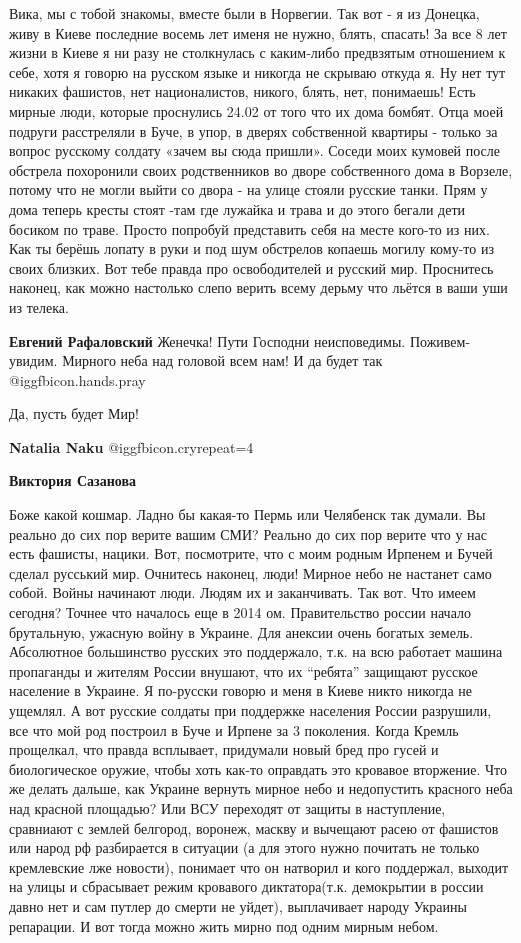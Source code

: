 \begin{itemize}
\begin{itemize}
Вика, мы с тобой знакомы, вместе были в Норвегии. Так вот - я из Донецка, живу
в Киеве последние восемь лет именя не нужно, блять, спасать! За все 8 лет жизни
в Киеве я ни разу не столкнулась с каким-либо предвзятым отношением к себе,
хотя я говорю на русском языке и никогда не скрываю откуда я. Ну нет тут
никаких фашистов, нет националистов, никого, блять, нет, понимаешь! Есть мирные
люди, которые проснулись 24.02 от того что их дома бомбят. Отца моей подруги
расстреляли в Буче, в упор, в дверях собственной квартиры - только за вопрос
русскому солдату «зачем вы сюда пришли». Соседи моих кумовей после обстрела
похоронили своих родственников во дворе собственного дома в Ворзеле, потому что
не могли выйти со двора - на улице стояли русские танки. Прям у дома теперь
кресты стоят -там где лужайка и трава и до этого бегали дети босиком по траве.
Просто попробуй представить себя на месте кого-то из них. Как ты берёшь лопату
в руки и под шум обстрелов копаешь могилу кому-то из своих близких. Вот тебе
правда про освободителей и русский мир. Проснитесь наконец, как можно настолько
слепо верить всему дерьму что льётся в ваши уши из телека.

\textbf{Евгений Рафаловский} Женечка! Пути Господни неисповедимы. Поживем-увидим. Мирного неба над головой всем нам! И да будет так  @igg{fbicon.hands.pray}

Да, пусть будет Мир!

\textbf{Natalia Naku}  @igg{fbicon.cry}{repeat=4} 

\textbf{Виктория Сазанова} 

Боже какой кошмар. Ладно бы какая-то Пермь или Челябенск так думали. Вы реально
до сих пор верите вашим СМИ? Реально до сих пор верите что у нас есть фашисты,
нацики. Вот, посмотрите, что с моим родным Ирпенем и Бучей сделал русський мир.
Очнитесь наконец, люди! Мирное небо не настанет само собой. Войны начинают
люди. Людям их и заканчивать. Так вот. Что имеем сегодня? Точнее что началось
еще в 2014 ом. Правительство россии начало брутальную, ужасную войну в Украине.
Для анексии очень богатых земель. Абсолютное большинство русских это
поддержало, т.к. на всю работает машина пропаганды и жителям России внушают,
что их \enquote{ребята} защищают русское население в Украине. Я по-русски говорю и меня
в Киеве никто никогда не ущемлял. А вот русские солдаты при поддержке населения
России разрушили, все что мой род построил в Буче и Ирпене за 3 поколения.
Когда Кремль прощелкал, что правда всплывает, придумали новый бред про гусей и
биологическое оружие, чтобы хоть как-то оправдать это кровавое вторжение. Что
же делать дальше, как Украине вернуть мирное небо и недопустить красного неба
над красной площадью? Или ВСУ переходят от защиты в наступление, сравниают с
землей белгород, воронеж, маскву и вычещают расею от фашистов или народ рф
разбирается в ситуации (а для этого нужно почитать не только кремлевские лже
новости), понимает что он натворил и кого поддержал, выходит на улицы и
сбрасывает режим кровавого диктатора(т.к. демокрытии в россии давно нет и сам
путлер до смерти не уйдет), выплачивает народу Украины репарации. И вот тогда
можно жить мирно под одним мирным небом.


\end{itemize}
\end{itemize}

